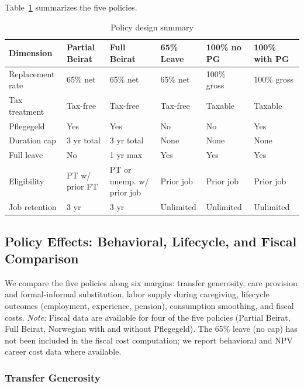 Table~\ref{tab:policy_design} summarizes the five policies.

\begin{table}[htbp]
  \centering
  \caption{Policy design summary}
  \label{tab:policy_design}
  \small
  \begin{tabular}{llllll}
    \toprule
    Dimension & Partial Beirat & Full Beirat & 65\% Leave & 100\% no PG & 100\% with PG \\
    \midrule
    Replacement rate & 65\% net & 65\% net & 65\% net & 100\% gross & 100\% gross \\
    Tax treatment & Tax-free & Tax-free & Tax-free & Taxable & Taxable \\
    Pflegegeld & Yes & Yes & No & No & Yes \\
    Duration cap & 3 yr total & 3 yr total & None & None & None \\
    Full leave & No & 1 yr max & Yes & Yes & Yes \\
    Eligibility & PT w/ prior FT & PT or unemp. w/ prior job & Prior job & Prior job & Prior job \\
    Job retention & 3 yr & 3 yr & Unlimited & Unlimited & Unlimited \\
    \bottomrule
  \end{tabular}
\end{table}

\subsection{Policy Effects: Behavioral, Lifecycle, and Fiscal Comparison}
\label{subsec:policy_effects}

We compare the five policies along six margins: transfer generosity, care provision and formal-informal substitution, labor supply during caregiving, lifecycle outcomes (employment, experience, pension), consumption smoothing, and fiscal costs. \textit{Note:} Fiscal data are available for four of the five policies (Partial Beirat, Full Beirat, Norwegian with and without Pflegegeld). The 65\% leave (no cap) has not been included in the fiscal cost computation; we report behavioral and NPV career cost data where available.

\subsubsection{Transfer Generosity}

